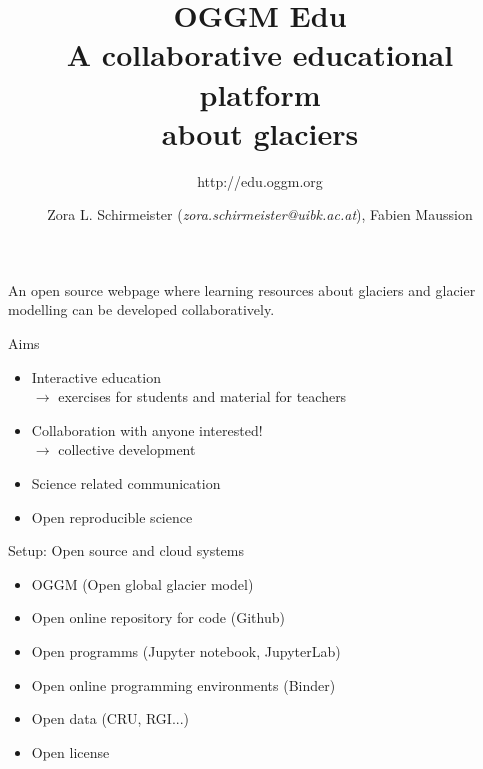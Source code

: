 \documentclass[final]{beamer}
\title{OGGM Edu \\ \vspace{1cm} A collaborative educational platform \\ about glaciers}
\subtitle{http://edu.oggm.org}
\author{Zora L. Schirmeister (\textit{zora.schirmeister@uibk.ac.at}), Fabien Maussion}
\begin{document}
\begin{frame}[fragile]

\vspace*{-14cm}
\vspace*{3cm}

\centering
		\begin{boxblock}{}
						{\large \color{uibkblue} An open source webpage where learning resources about glaciers and glacier modelling can be developed collaboratively.}
		\end{boxblock}

\vspace*{0.5cm}

	\begin{minipage}[t]{36cm}
		\vspace{0pt}
		\begin{boxblock}{Aims}
				\begin{itemize}
						\item Interactive education \\$\rightarrow$ exercises for students and material for teachers
						\item Collaboration with anyone interested! \\$\rightarrow$ collective development
						\item Science related communication
						\item Open reproducible science
				\end{itemize}
		\end{boxblock}
	\end{minipage}
\hspace*{7.15cm}
	\begin{minipage}[t]{36cm}
		\vspace{0pt}
		\begin{boxblock}{Setup: Open source and cloud systems}
				\begin{itemize}
						\item OGGM (Open global glacier model)
						\item Open online repository for code (Github)
						\item Open programms (Jupyter notebook, JupyterLab)
						\item Open online programming environments (Binder)
						\item Open data (CRU, RGI...)
						\item Open license
				\end{itemize}
		\end{boxblock}
	\end{minipage}


\end{frame}
\end{document}
